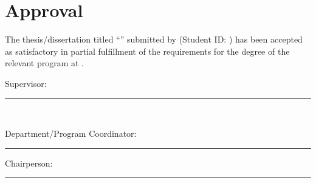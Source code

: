\chapter*{Approval}

The thesis/dissertation titled ``\thesistitle'' submitted by \studentname{} (Student ID: \studentid) has been accepted as satisfactory in partial fulfillment of the requirements for the degree of the relevant program at \university.

\vspace{1.5cm}
\noindent Supervisor:

\vspace{1.2cm}
\noindent\rule{8cm}{0.4pt}\\
\supervisorname

\vspace{1.5cm}
\noindent Department/Program Coordinator:

\vspace{1.2cm}
\noindent\rule{8cm}{0.4pt}

\vspace{1.5cm}
\noindent Chairperson:

\vspace{1.2cm}
\noindent\rule{8cm}{0.4pt}
